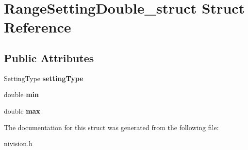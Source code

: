 \hypertarget{structRangeSettingDouble__struct}{
\section{RangeSettingDouble\_\-struct Struct Reference}
\label{structRangeSettingDouble__struct}
}
\subsection*{Public Attributes}
\begin{DoxyCompactItemize}
\item 
\hypertarget{structRangeSettingDouble__struct_aaacb450e1dcc1d6c1f05d41a2ad84427}{
SettingType {\bfseries settingType}}
\label{structRangeSettingDouble__struct_aaacb450e1dcc1d6c1f05d41a2ad84427}

\item 
\hypertarget{structRangeSettingDouble__struct_acc7204ed73b19e109a7f58058167323f}{
double {\bfseries min}}
\label{structRangeSettingDouble__struct_acc7204ed73b19e109a7f58058167323f}

\item 
\hypertarget{structRangeSettingDouble__struct_a92183917d884429db802c13a52cbf573}{
double {\bfseries max}}
\label{structRangeSettingDouble__struct_a92183917d884429db802c13a52cbf573}

\end{DoxyCompactItemize}


The documentation for this struct was generated from the following file:\begin{DoxyCompactItemize}
\item 
nivision.h\end{DoxyCompactItemize}
